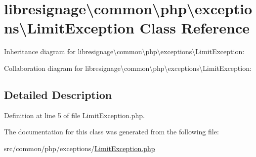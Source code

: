 \hypertarget{classlibresignage_1_1common_1_1php_1_1exceptions_1_1LimitException}{}\section{libresignage\textbackslash{}common\textbackslash{}php\textbackslash{}exceptions\textbackslash{}Limit\+Exception Class Reference}
\label{classlibresignage_1_1common_1_1php_1_1exceptions_1_1LimitException}


Inheritance diagram for libresignage\textbackslash{}common\textbackslash{}php\textbackslash{}exceptions\textbackslash{}Limit\+Exception\+:


Collaboration diagram for libresignage\textbackslash{}common\textbackslash{}php\textbackslash{}exceptions\textbackslash{}Limit\+Exception\+:


\subsection{Detailed Description}


Definition at line 5 of file Limit\+Exception.\+php.



The documentation for this class was generated from the following file\+:\begin{DoxyCompactItemize}
\item 
src/common/php/exceptions/\hyperlink{LimitException_8php}{Limit\+Exception.\+php}\end{DoxyCompactItemize}
